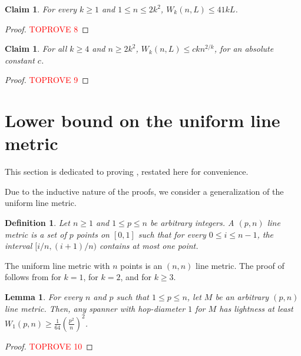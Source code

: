 \documentclass[11pt,english]{article}
\newtheorem{lemma}[theorem]{Lemma}
\newtheorem{definition}[theorem]{Definition}
\newtheorem{claim}[theorem]{Claim}
\begin{document}
\begin{claim}
For every $k\ge 1$ and $1 \le n \le 2k^2$, $W_k(n, L) \le 41kL$.
\end{claim}
\begin{proof}\textcolor{red}{TOPROVE 8}\end{proof}

\begin{claim}
For all $k \ge 4$ and $n \ge 2k^2$, $W_k(n, L) \le ckn^{2/k}$, for an absolute constant $c$.
\end{claim}
\begin{proof}\textcolor{red}{TOPROVE 9}\end{proof} \section{Lower bound on the uniform line metric}\label{sec:lb}
This section is dedicated to proving , restated here for convenience.
\lb*

Due to the inductive nature of the proofs, we consider a generalization of the uniform line metric. 
\begin{definition}
Let $n \ge 1$ and $1 \le p \le n$ be arbitrary integers. A $(p, n)$ line metric is a set of $p$ points on $[0,1]$ such that for every $0 \le i \le n-1$, the interval $[i/n, (i+1)/n)$ contains at most one point.
\end{definition}

The uniform line metric with $n$ points is an $(n,n)$ line metric. The proof of  follows from  for $k=1$,  for $k=2$, and  for $k \ge 3$.
\begin{lemma}\label{st:lb-1}
For every $n$ and $p$ such that $1 \le p \le n$, let $M$ be an arbitrary $(p,n)$ line metric. Then, any spanner with hop-diameter $1$ for $M$ has lightness at least $W_1(p,n) \ge  \frac{1}{64}\left(\frac{p^2}{n}\right)^2$.
\end{lemma}
\begin{proof}\textcolor{red}{TOPROVE 10}\end{proof}
\end{document}
